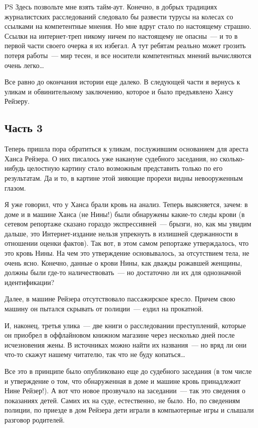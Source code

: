 PS Здесь позвольте мне взять тайм-аут. Конечно, в добрых традициях журналистских расследований следовало бы развести турусы на колесах со ссылками на компетентные мнения. Но мне вдруг стало по настоящему страшно. Ссылки на интернет-треп никому ничем по настоящему не опасны~--- и то в первой части своего очерка я их избегал. А тут ребятам реально может грозить потеря работы~--- мир тесен, и все носители компетентных мнений вычисляются очень легко\dots 

Все равно до окончания истории еще далеко. В следующей части я вернусь к уликам и обвинительному заключению, которое и было предъявлено Хансу Рейзеру. 

\subsection{Часть 3}

Теперь пришла пора обратиться к уликам, послужившим основанием для ареста Ханса Рейзера. О них писалось уже накануне судебного заседания, но сколько-нибудь целостную картину стало возможным представить только по его результатам. Да и то, в картине этой зияющие прорехи видны невооруженным глазом. 

Я уже говорил, что у Ханса брали кровь на анализ. Теперь выясняется, зачем: в доме и в машине Ханса (не Нины!) были обнаружены какие-то следы крови (в сетевом репортаже сказано гораздо экспрессивней~--- брызги, но, как мы увидим дальше, это Интернет-издание нельзя упрекнуть в излишней сдержанности в отношении оценки фактов). Так вот, в этом самом репортаже утверждалось, что это кровь Нины. На чем это утверждение основывалось, за отсутствием тела, не очень ясно. Конечно, данные о крови Нины, как дважды рожавшей женщины, должны были где-то наличествовать~--- но достаточно ли их для однозначной идентификации? 

Далее, в машине Рейзера отсутствовало пассажирское кресло. Причем свою машину он пытался скрывать от полиции~--- ездил на прокатной. 

И, наконец, третья улика~--- две книги о расследовании преступлений, которые он приобрел в оффлайновом книжном магазине через несколько дней после исчезновения жены. В источниках можно найти их названия~--- но вряд ли они что-то скажут нашему читателю, так что не буду копаться\dots 

Все это в принципе было опубликовано еще до судебного заседания (в том числе и утверждение о том, что обнаруженная в доме и машине кровь принадлежит Нине Рейзер!). А вот что новое прозвучало на заседании~--- так это сведения о показаниях детей. Самих их на суде, естественно, не было. Но, по сведениям полиции, по приезде в дом Рейзера дети играли в компьютерные игры и слышали разговор родителей. 

